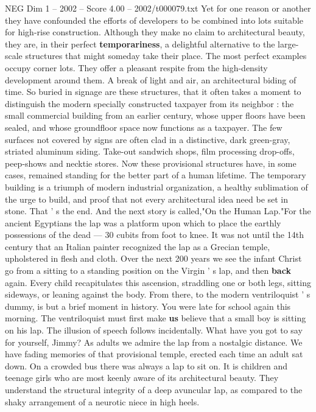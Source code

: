 \begin{textsample}{NEG Dim 1 – 2002 – Score 4.00 – 2002/t000079.txt}
Yet for one reason or another they have confounded the efforts of developers to be combined into lots suitable for high-rise construction.
Although they make no claim to architectural beauty, they are, in their perfect \textbf{temporariness}, a delightful alternative to the large-scale structures that might someday take their place.
The most perfect examples occupy corner lots.
They offer a pleasant respite from the high-density development around them.
A break of light and air, an architectural biding of time.
So buried in signage are these structures, that it often takes a moment to distinguish the modern specially constructed taxpayer from its neighbor : the small commercial building from an earlier century, whose upper floors have been sealed, and whose groundfloor space now functions as a taxpayer.
The few surfaces not covered by signs are often clad in a distinctive, dark green-gray, striated aluminum siding.
Take-out sandwich shops, film processing drop-offs, peep-shows and necktie stores.
Now these provisional structures have, in some cases, remained standing for the better part of a human lifetime.
The temporary building is a triumph of modern industrial organization, a healthy sublimation of the urge to build, and proof that not every architectural idea need be set in stone.
That ' s the end.
And the next story is called,"On the Human Lap."For the ancient Egyptians the lap was a platform upon which to place the earthly possessions of the dead — 30 cubits from foot to knee.
It was not until the 14th century that an Italian painter recognized the lap as a Grecian temple, upholstered in flesh and cloth.
Over the next 200 years we see the infant Christ go from a sitting to a standing position on the Virgin ' s lap, and then \textbf{back} again.
Every child recapitulates this ascension, straddling one or both legs, sitting sideways, or leaning against the body.
From there, to the modern ventriloquist ' s dummy, is but a brief moment in history.
You were late for school again this morning.
The ventriloquist must first make \textbf{us} believe that a small boy is sitting on his lap.
The illusion of speech follows incidentally.
What have you got to say for yourself, Jimmy?
As adults we admire the lap from a nostalgic distance.
We have fading memories of that provisional temple, erected each time an adult sat down.
On a crowded bus there was always a lap to sit on.
It is children and teenage girls who are most keenly aware of its architectural beauty.
They understand the structural integrity of a deep avuncular lap, as compared to the shaky arrangement of a neurotic niece in high heels.

\end{textsample}
